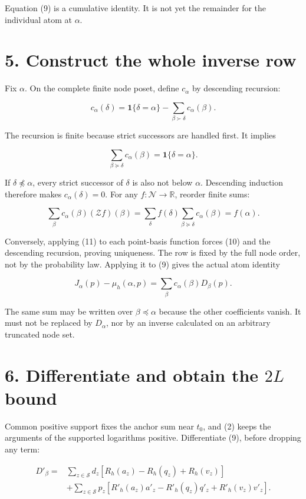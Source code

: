 \documentclass[11pt,a4paper]{article}
\begin{document}
Equation (9) is a cumulative identity. It is not yet the remainder for the individual atom at \(\alpha\).

\section{5. Construct the whole inverse row}\label{construct-the-whole-inverse-row}

Fix \(\alpha\). On the complete finite node poset, define \(c_\alpha\) by descending recursion:

\[
c_\alpha(\delta)=\mathbf1\{\delta=\alpha\}
-\sum_{\beta\succ\delta}c_\alpha(\beta).
\]

The recursion is finite because strict successors are handled first. It implies

\[
\sum_{\beta\succeq\delta}c_\alpha(\beta)=\mathbf1\{\delta=\alpha\}. \tag{10}
\]

If \(\delta\not\preceq\alpha\), every strict successor of \(\delta\) is also not below \(\alpha\). Descending induction therefore makes \(c_\alpha(\delta)=0\). For any \(f:\mathcal N\to\mathbb R\), reorder finite sums:

\[
\sum_\beta c_\alpha(\beta)(\mathcal Zf)(\beta)
=\sum_\delta f(\delta)\sum_{\beta\succeq\delta}c_\alpha(\beta)
=f(\alpha). \tag{11}
\]

Conversely, applying (11) to each point-basis function forces (10) and the descending recursion, proving uniqueness. The row is fixed by the full node order, not by the probability law. Applying it to (9) gives the actual atom identity

\[
J_\alpha(p)-\mu_h(\alpha,p)=\sum_\beta c_\alpha(\beta)D_\beta(p). \tag{12}
\]

The same sum may be written over \(\beta\preceq\alpha\) because the other coefficients vanish. It must not be replaced by \(D_\alpha\), nor by an inverse calculated on an arbitrary truncated node set.

\section{\texorpdfstring{6. Differentiate and obtain the \(2L\) bound}{6. Differentiate and obtain the 2L bound}}\label{differentiate-and-obtain-the-2l-bound}

Common positive support fixes the anchor sum near \(t_0\), and (2) keeps the arguments of the supported logarithms positive. Differentiate (9), before dropping any term:

\[
\begin{aligned}
D'_\beta={}&\sum_{z\in\mathcal S}d_z[R_h(a_z)-R_h(q_z)+R_h(v_z)]\\
&+\sum_{z\in\mathcal S}p_z
[R'_h(a_z)a'_z-R'_h(q_z)q'_z+R'_h(v_z)v'_z].
\end{aligned} \tag{13}
\]
\end{document}
